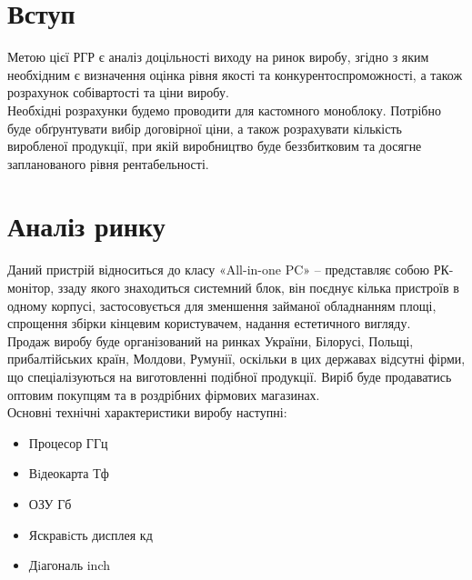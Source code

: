 \documentclass[a4paper,14pt]{extreport}
\begin{document}
\chapter{Вступ}
    Метою цієї РГР є аналіз доцільності виходу на ринок виробу, згідно з яким
    необхідним є визначення оцінка рівня якості та конкурентоспроможності, а також
    розрахунок собівартості та ціни виробу.\\ 

    Необхідні розрахунки будемо проводити для кастомного моноблоку. 
    Потрібно буде обґрунтувати вибір договірної ціни, а також розрахувати кількість
    виробленої продукції, при якій виробництво буде беззбитковим та досягне
    запланованого рівня рентабельності.


\chapter{Аналіз ринку}
    Даний   пристрій відноситься до класу «All-in-one PC» -- представляє собою РК-монітор, ззаду якого знаходиться системний блок, він поєднує кілька пристроїв в одному корпусі, застосовується для зменшення займаної обладнанням площі, спрощення збірки кінцевим користувачем, надання естетичного вигляду.\\

    Продаж виробу буде організований на ринках України, Білорусі, Польщі, прибалтійських
    країн, Молдови, Румунії, оскільки в цих державах відсутні фірми, що спеціалізуються на
    виготовленні подібної продукції.  Виріб буде продаватись оптовим покупцям та в роздрібних фірмових магазинах.\\ 

    Основні технічні характеристики виробу наступні:
    \begin{itemize}
    \item Процесор  ГГц 
    \item Вiдеокарта  Тф
    \item ОЗУ  Гб
    \item Яскравiсть дисплея  кд
    \item Дiагональ  inch
    \end{itemize}
\end{document}
